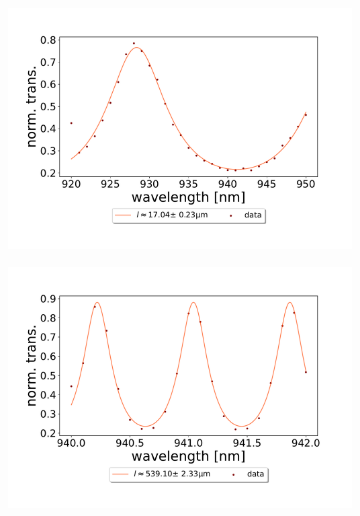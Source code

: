 \begin{figure}[h!]
    \centering
    \begin{subfigure}[b]{0.49\textwidth}
        \centering
        \includegraphics[width=\textwidth]{figures/results/double fano fits/30um_M3:M5_FSR_scan.pdf}
        \caption{}
        \label{fig:short_double_fano_FSR}
    \end{subfigure}
    \begin{subfigure}[b]{0.49\textwidth}
        \centering
        \includegraphics[width=\textwidth]{figures/results/double fano fits/550um_M3:M5_FSR_scan.pdf}
        \caption{}
        \label{fig:long_double_fano_FSR}
    \end{subfigure}
    \caption{}
    \label{fig:double_fano_fsr_scans}
\end{figure}

